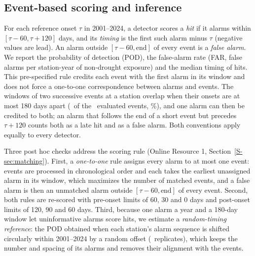 \documentclass[pdflatex,sn-mathphys-ay]{sn-jnl}
\theoremstyle{thmstyletwo}
\begin{document}
\subsection{Event-based scoring and inference}\label{sec:scoring}
For each reference onset $\tau$ in 2001--2024, a detector scores a \emph{hit} if it alarms within
$[\tau-60,\tau+120]$ days, and its \emph{timing} is the first such alarm minus $\tau$ (negative values
are lead). An alarm outside $[\tau-60,\text{end}]$ of every event is a \emph{false alarm}. We report
the probability of detection (POD), the false-alarm rate (FAR, false alarms per station-year of
non-drought exposure) and the median timing of hits. This pre-specified rule credits each event with the
first alarm in its window and does not force a one-to-one correspondence between alarms and events. The
windows of two successive events at a station overlap when their onsets are at most 180 days apart
(\noverlapall\ of the \nevall\ evaluated events, \pctoverlapall\%), and one alarm can then be credited
to both; an alarm that follows the end of a short event but precedes $\tau+120$ counts both as a late
hit and as a false alarm. Both conventions apply equally to every detector.

Three post hoc checks address the scoring rule (Online Resource 1, Section~\ref{S-sec:matching}). First,
a \emph{one-to-one} rule assigns every alarm to at most one event: events are processed in chronological
order and each takes the earliest unassigned alarm in its window, which maximizes the number of matched
events, and a false alarm is then an unmatched alarm outside $[\tau-60,\text{end}]$ of every event.
Second, both rules are re-scored with pre-onset limits of 60, 30 and 0 days and post-onset limits of 120,
90 and 60 days. Third, because one alarm a year and a 180-day window let uninformative alarms score hits,
we estimate a \emph{random-timing reference}: the POD obtained when each station's alarm sequence is
shifted circularly within 2001--2024 by a random offset (\nshift\ replicates), which keeps the number
and spacing of its alarms and removes their alignment with the events.
\end{document}
